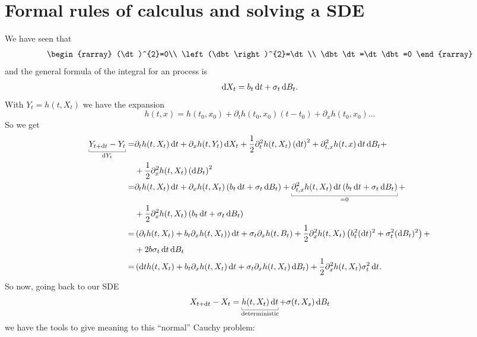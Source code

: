 \documentclass[12pt]{report}
\begin{document}
\section{Formal rules of \ito{} calculus and solving a SDE}
We have seen that
\begin{equation*}
	\begin{rarray}
		(\dt)^{2}=0\\
		\left(\dbt\right)^{2}=\dt\\
		\dbt\dt=\dt\dbt=0
	\end{rarray}
\end{equation*}
and the general formula of the integral for an \ito{} process is
\begin{equation*}
	\mathop{}\!\mathrm{d} X_{t}=b_{t}\mathop{}\!\mathrm{d} t+\sigma_{t}\mathop{}\!\mathrm{d} B_{t}.
\end{equation*}
With $Y_{t}=h(t,X_{t})$ we have the expansion
\begin{equation*}
	h(t,x)=h(t_{0},x_{0})+\partial_{t}h(t_{0},x_{0})(t-t_{0})+\partial_{x}h(t_{0},x_{0})\ldots
\end{equation*}
So we get 
\begin{align*}
	\ubracketthin{Y_{t+\dt}-Y_{t}}_{\dif Y_{t}}=&\partial_{t}h(t,X_{t})\dt+\partial_{x}h(t,Y_{t})\dif X_{t}+\unmezz\partial^{2}_{t}h(t,X_{t})\left(\dt\right)^{2}+\partial^{2}_{t,x}h(t,x)\dt\dbt+\\&+\unmezz\partial^{2}_{x}h(t,X_{t})\left(\dbt\right)^{2}\\
	=&\partial_{t}h(t,X_{t})\dt+\partial_{x}h(t,X_{t})\left(b_{t}\dt+\sigma_{t}\dbt\right)+\ubracketthin{\partial^{2}_{t,x}h(t,X_{t})\dt\left(b_{t}\dt+\sigma_{t}\dbt\right)}_{=0}+\\
	&+\unmezz\partial^{2}_{x}h(t,X_{t})\left(b_{t}\dt+\sigma_{t}\dbt\right)\\
	=&\left(\partial_{t}h(t,X_{t})+b_{t}\partial_{x}h(t,X_{t})\right)\dt+\sigma_{t}\partial_{x}h(t,B_{t})+\unmezz\partial^{2}_{x}h(t,X_{t})\left(b^{2}_{t}(\dt)^{2}+\sigma^{2}_{t}(\dbt)^{2}\right)+\\
	&+2b\sigma_{t}\dt\dbt\\
	=&\left(\dt h(t,X_{t})+b_{t}\partial_{x}h(t,X_{t})\dt+\sigma_{t}\partial_{x}h(t,X_{t})\dbt\right)+\unmezz\partial^{2}_{x}h(t,X_{t})\sigma^{2}_{t}\dt.
\end{align*}
So now, going back to our SDE
\begin{equation*}
	X_{t+\dt}-X_{t}=\ubracketthin{h(t,X_{t})\dt}_{\claptext{deterministic}}+\sigma(t,X_{s})\dbt
\end{equation*}
we have the tools to give meaning to this ``normal'' Cauchy problem:
\end{document}
